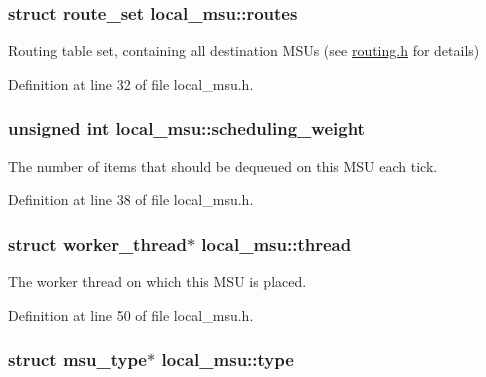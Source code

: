 \hypertarget{structlocal__msu_ad5a5a49f5e637d526668a373fd741ad8}{
\subsubsection[{routes}]{\setlength{\rightskip}{0pt plus 5cm}struct {\bf route\-\_\-set} local\-\_\-msu\-::routes}}\label{structlocal__msu_ad5a5a49f5e637d526668a373fd741ad8}


Routing table set, containing all destination M\-S\-Us (see \hyperlink{routing_8h}{routing.\-h} for details) 



Definition at line 32 of file local\-\_\-msu.\-h.

\hypertarget{structlocal__msu_afa2bd1495e53a10cf352af70aaaba10d}{
\subsubsection[{scheduling\-\_\-weight}]{\setlength{\rightskip}{0pt plus 5cm}unsigned int local\-\_\-msu\-::scheduling\-\_\-weight}}\label{structlocal__msu_afa2bd1495e53a10cf352af70aaaba10d}


The number of items that should be dequeued on this M\-S\-U each tick. 



Definition at line 38 of file local\-\_\-msu.\-h.

\hypertarget{structlocal__msu_a8f2b8ca820e060261f888b3bcb01d222}{
\subsubsection[{thread}]{\setlength{\rightskip}{0pt plus 5cm}struct {\bf worker\-\_\-thread}$\ast$ local\-\_\-msu\-::thread}}\label{structlocal__msu_a8f2b8ca820e060261f888b3bcb01d222}


The worker thread on which this M\-S\-U is placed. 



Definition at line 50 of file local\-\_\-msu.\-h.

\hypertarget{structlocal__msu_a4a5eb0c93e0be80ec816c050662885b3}{
\subsubsection[{type}]{\setlength{\rightskip}{0pt plus 5cm}struct {\bf msu\-\_\-type}$\ast$ local\-\_\-msu\-::type}}\label{structlocal__msu_a4a5eb0c93e0be80ec816c050662885b3}


